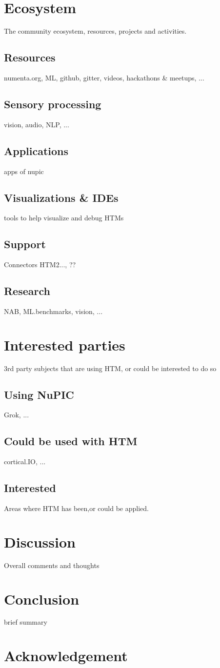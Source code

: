 \documentclass[a4,IEEEconf]{article}
\begin{document}
\section{Ecosystem}
The community ecosystem, resources, projects and activities. 
\subsection{Resources}
numenta.org, ML, github, gitter, videos, hackathons \& meetups, ...
\subsection{Sensory processing}
vision, audio, NLP, ...
\subsection{Applications}
apps of nupic
\subsection{Visualizations \& IDEs}
tools to help visualize and debug HTMs
\subsection{Support}
Connectors HTM2..., ??
\subsection{Research}
NAB, ML.benchmarks, vision, ...

\section{Interested parties}
3rd party subjects that are using HTM, or could be interested to do so
\subsection{Using NuPIC}
Grok, ...
\subsection{Could be used with HTM}
cortical.IO, ...
\subsection{Interested}
Areas where HTM has been,or could be applied. 

\section{Discussion}
Overall comments and thoughts

\section{Conclusion}
brief summary

\section{Acknowledgement}


\end{document}
